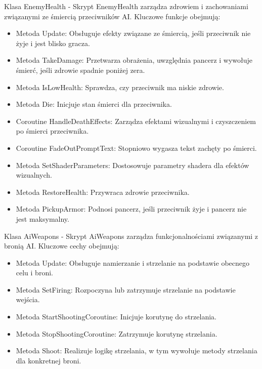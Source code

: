 Klasa EnemyHealth -
Skrypt EnemyHealth zarządza zdrowiem i zachowaniami związanymi ze śmiercią przeciwników AI. Kluczowe funkcje obejmują:
\begin{itemize}
\item Metoda Update: Obsługuje efekty związane ze śmiercią, jeśli przeciwnik nie żyje i jest blisko gracza.
\item Metoda TakeDamage: Przetwarza obrażenia, uwzględnia pancerz i wywołuje śmierć, jeśli zdrowie spadnie poniżej zera.
\item Metoda IsLowHealth: Sprawdza, czy przeciwnik ma niskie zdrowie.
\item Metoda Die: Inicjuje stan śmierci dla przeciwnika.
\item Coroutine HandleDeathEffects: Zarządza efektami wizualnymi i czyszczeniem po śmierci przeciwnika.
\item Coroutine FadeOutPromptText: Stopniowo wygasza tekst zachęty po śmierci.
\item Metoda SetShaderParameters: Dostosowuje parametry shadera dla efektów wizualnych.
\item Metoda RestoreHealth: Przywraca zdrowie przeciwnika.
\item Metoda PickupArmor: Podnosi pancerz, jeśli przeciwnik żyje i pancerz nie jest maksymalny.
\end{itemize}

Klasa AiWeapons -
Skrypt AiWeapons zarządza funkcjonalnościami związanymi z bronią AI. Kluczowe cechy obejmują:
\begin{itemize}
\item Metoda Update: Obsługuje namierzanie i strzelanie na podstawie obecnego celu i broni.
\item Metoda SetFiring: Rozpoczyna lub zatrzymuje strzelanie na podstawie wejścia.
\item Metoda StartShootingCoroutine: Inicjuje korutynę do strzelania.
\item Metoda StopShootingCoroutine: Zatrzymuje korutynę strzelania.
\item Metoda Shoot: Realizuje logikę strzelania, w tym wywołuje metody strzelania dla konkretnej broni.
\end{itemize}

